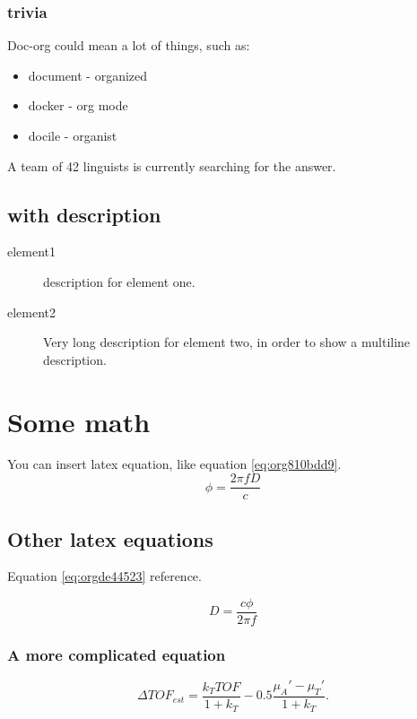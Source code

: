 \subsubsection{trivia}
\label{sec:orgfdc1da3}
Doc-org could mean a lot of things, such as:
\begin{itemize}
\item document - organized
\item docker - org mode
\item docile - organist
\end{itemize}
A team of 42 linguists is currently searching for the answer.
\subsection{with description}
\label{sec:org7f41ceb}
\begin{description}
\item[{element1}] description for element one.
\item[{element2}] Very long description for element two, in order to show a
multiline description.
\end{description}

\section{Some math}
\label{sec:org9d8abfe}
You can insert latex equation, like equation \ref{eq:org810bdd9}.
\begin{equation}
\label{eq:org810bdd9}
\phi = \frac{2\pi fD}{c}
\end{equation}
\subsection{Other latex equations}
\label{sec:org629020b}
Equation \ref{eq:orgde44523} reference.

\begin{equation}
\label{eq:orgde44523}
D = \frac{c\phi}{2\pi f}
\end{equation}

\subsubsection{A more complicated equation}
\label{sec:org0d358cf}

\begin{equation}
\Delta TOF_{est} = \frac{k_T TOF}{1+k_T } - 0.5 \frac{\mu_A' - \mu_T'}{1+k_T}.
\end{equation}

